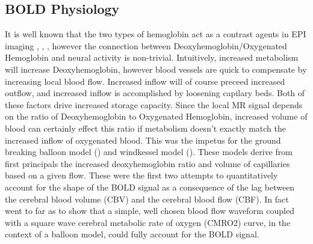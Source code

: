 \documentclass{article}
\begin{document}
\subsection{BOLD Physiology}
It is well known that the two types of hemoglobin act as a contrast agents in 
EPI imaging
\cite{Buxton1998}, \cite{WEISSKOFF1994}, \cite{Ogawa}, however the connection
between Deoxyhemoglobin/Oxygenated Hemoglobin and neural activity is non-trivial. 
Intuitively, increased 
metabolism will increase Deoxyhemoglobin, however blood vessels are quick
to compensate by increasing local blood flow. Increased inflow will of course
preceed increased outflow, and increased inflow is accomplished by loosening 
capilary beds. Both of these factors drive increased storage capacity.
Since the local MR signal depends on the ratio of Deoxyhemoglobin to Oxygenated
Hemoglobin, increased volume of blood can certainly effect this ratio if 
metabolism doesn't exactly match the increased inflow of oxygenated blood.
This was the impetus
for the ground breaking balloon model (\cite{Buxton1998}) and windkessel
model (\cite{Mandeville1999}). These models derive from first principals
the increased deoxyhemoglobin ratio and volume of capillaries based on a given flow.
These were the first two attempts to quantitatively account for the shape of the 
BOLD signal as a consequence of the lag between the cerebral blood volume (CBV) 
and the cerebral blood flow (CBF). In fact \cite{Buxton1998} went to far as
to show that a simple, well chosen blood flow waveform coupled with a square 
wave cerebral metabolic rate of oxygen (CMRO2) curve, in the context of a balloon 
model, could fully account for the BOLD signal. 
\end{document}
